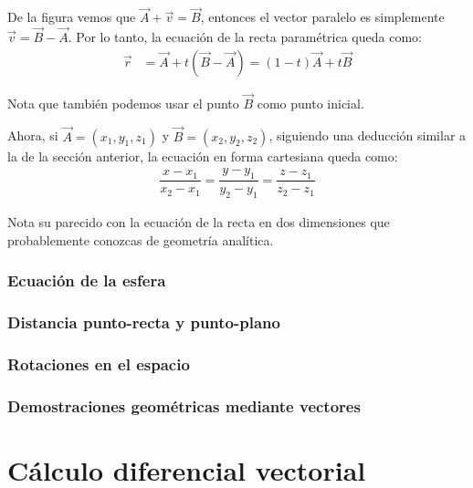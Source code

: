 \documentclass[12pt, fleqn]{report}                             %
\theoremstyle{break}                                            %
\newcommand{\Wrap}[1]{\left( #1 \right)}                        %
\begin{document}
            De la figura vemos que $\vec{A}+\vec{v}=\vec{B}$, entonces el vector paralelo es simplemente $\vec{v}=\vec{B}-\vec{A}$. Por lo tanto, la ecuación de la recta paramétrica queda como:
            \begin{align}
                \vec{r} &= \vec{A} + t\Wrap{\vec{B}-\vec{A}} = (1-t)\vec{A}+t\vec{B} \label{lineEquation2}
            \end{align}
            
            Nota que también podemos usar el punto $\vec{B}$ como punto inicial.
            
            Ahora, si $\vec{A}=(x_1, y_1, z_1)$ y $\vec{B}=(x_2, y_2, z_2)$, siguiendo una deducción similar a la de la sección anterior, la ecuación en forma cartesiana queda como:
            \begin{align}
                \dfrac{x - x_1}{x_2 - x_1} = \dfrac{y - y_1}{y_2 - y_1} = \dfrac{z - z_1}{z_2 - z_1} \label{lineEquation3}
            \end{align}
            
            Nota su parecido con la ecuación de la recta en dos dimensiones que probablemente conozcas de geometría analítica.
        
        \section{Ecuación de la esfera}
            
        \section{Distancia punto-recta y punto-plano}
        
        \section{Rotaciones en el espacio}
        
        \section{Demostraciones geométricas mediante vectores}
            


\part{Cálculo diferencial vectorial}
\end{document}
